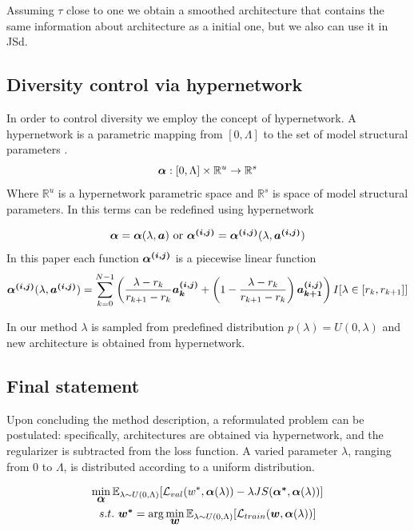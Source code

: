 \documentclass{article}
\begin{document}
Assuming $\tau$ close to one we obtain a smoothed architecture that contains the same information about architecture as a initial one, but we also can use it in JSd.

\subsection{Diversity control via hypernetwork}

In order to control diversity we employ the concept of hypernetwork. A hypernetwork is a parametric mapping from $[0, \Lambda]$ to the set of model structural parameters \citep{darts-cc}.
$$
\mbox{\boldmath{$\alpha$}} : [0, \Lambda] \times \mathbb{R}^u \to \mathbb{R}^s
$$
Where $\mathbb{R}^u$ is a hypernetwork parametric space and $\mathbb{R}^s$ is space of model structural parameters. In this terms \mbox{\boldmath{$\alpha$}} can be redefined using hypernetwork

$$
\mbox{\boldmath{$\alpha$}} = \mbox{\boldmath{$\alpha$}}(\lambda, \mbox{\boldmath{$a$}}) \text{ or } \mbox{\boldmath{$\alpha^{(i, j)}$}} = \mbox{\boldmath{$\alpha^{(i, j)}$}}(\lambda, \mbox{\boldmath{$a^{(i, j)}$}})
$$
In this paper each function $\mbox{\boldmath{$\alpha^{(i, j)}$}}$ is a piecewise linear function
$$
\mbox{\boldmath{$\alpha^{(i, j)}$}}(\lambda, \mbox{\boldmath{$a^{(i, j)}$}}) = \sum_{k=0}^{N-1} \left( \frac{\lambda - r_k}{r_{k + 1} - r_k} \mbox{\boldmath{$a_k^{(i, j)}$}} + \left(1 - \frac{\lambda - r_k}{r_{k + 1} - r_k}\right) \mbox{\boldmath{$a_{k + 1}^{(i, j)}$}} \right) I[\lambda \in [r_k, r_{k+1}]]
$$

In our method $\lambda$ is sampled from predefined distribution $p(\lambda) = U(0, \lambda)$ and new architecture is obtained from hypernetwork.

\subsection{Final statement}

Upon concluding the method description, a reformulated problem can be postulated: specifically, architectures are obtained via hypernetwork, and the regularizer is subtracted from the loss function. A varied parameter $\lambda$, ranging from 0 to $\Lambda$, is distributed according to a uniform distribution.

\begin{gather*}
        \min_{\mbox{\boldmath{$\alpha$}}} \mathbb{E}_{\lambda \sim U(0, \Lambda)} [\mathcal{L}_{val}(w^*, \mbox{\boldmath{$\alpha$}}(\lambda)) - \lambda JS(\mbox{\boldmath{$\alpha^*$}}, \mbox{\boldmath{$\alpha$}}(\lambda))] \\
    s.t. \text{ } \mbox{\boldmath{$w^*$}} = \arg \min_{\mbox{\boldmath{$w$}}} \mathbb{E}_{\lambda \sim U(0, \Lambda)}[\mathcal{L}_{train}(\mbox{\boldmath{$w$}}, \mbox{\boldmath{$\alpha$}}(\lambda))]
\end{gather*}
\end{document}
